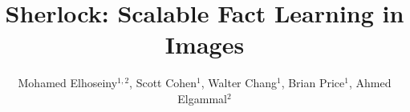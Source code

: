 \documentclass[runningheads]{llncs}
\begin{document}
\pagestyle{headings}
\mainmatter
\title{Sherlock: Scalable Fact Learning in Images} %

\author{ \small Mohamed Elhoseiny$^{1,2}$,  Scott Cohen$^{1}$,  Walter Chang$^{1}$,  Brian Price$^{1}$, Ahmed  Elgammal$^{2}$ \normalsize }

%

 \graphicspath{{./retrieval_qual3_seen_crop/}{./retrieval_qual3_unseen_crop/}{./KEx_qual2_crop/}{.//KEx_qual2_unseen_crop/}{./ret_qual3_gt5_seen_crop/}
 }


\maketitle
\end{document}
